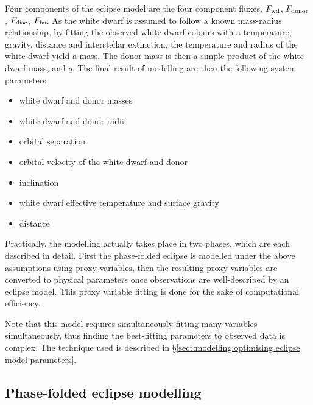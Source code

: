 Four components of the eclipse model are the four component fluxes, $F_{\rm wd}$, $F_{\rm donor}$, $F_{\rm disc}$, $F_{\rm bs}$.
As the white dwarf is assumed to follow a known mass-radius relationship, by fitting the observed white dwarf colours with a temperature, gravity, distance and interstellar extinction, the temperature and radius of the white dwarf yield a mass. The donor mass is then a simple product of the white dwarf mass, and $q$.
The final result of modelling are then the following system parameters:
\begin{itemize}
    \setlength\itemsep{0em}
    \item white dwarf and donor masses
    \item white dwarf and donor radii
    \item orbital separation
    \item orbital velocity of the white dwarf and donor
    \item inclination
    \item white dwarf effective temperature and surface gravity
    \item distance
\end{itemize}

Practically, the modelling actually takes place in two phases, which are each described in detail. First the phase-folded eclipse is modelled under the above assumptions using proxy variables, then the resulting proxy variables are converted to physical parameters once observations are well-described by an eclipse model. This proxy variable fitting is done for the sake of computational efficiency.

Note that this model requires simultaneously fitting many variables simultaneously, thus finding the best-fitting parameters to observed data is complex. The technique used is described in \S\ref{sect:modelling:optimising eclipse model parameters}.

\subsection{Phase-folded eclipse modelling}
\label{sect:modelling:eclipse modelling}

